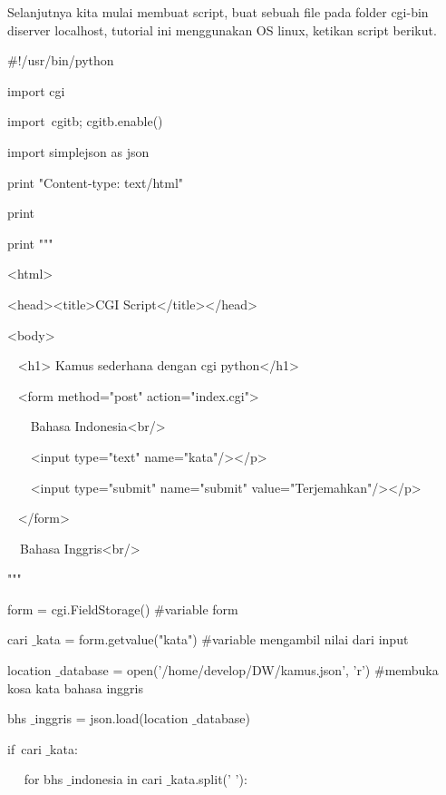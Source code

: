 \documentclass{wileySix}
\begin{document}
\noindent 
Selanjutnya kita mulai membuat script, buat sebuah file pada folder cgi-bin diserver localhost, tutorial ini menggunakan OS linux, ketikan script berikut. \par
\noindent 
$  \#  $!/usr/bin/python \par
\noindent 
import cgi \par
\noindent 
import~cgitb; cgitb.enable()   \par
\noindent 
import simplejson as json \par
\vspace{12pt}
\noindent 
print "Content-type: text/html" \par
\noindent 
print \par
\vspace{12pt}
\noindent 
print """ \par
\noindent 
<html> \par
\noindent 
<head><title>CGI Script</title></head> \par
\noindent 
<body> \par
\noindent 
~ <h1> Kamus sederhana dengan cgi python</h1> \par
\noindent 
~ <form method="post" action="index.cgi"> \par
\noindent 
~~~ Bahasa Indonesia<br/> \par
\noindent 
~~~ <input type="text" name="kata"/></p> \par
\noindent 
~~~ <input type="submit" name="submit" value="Terjemahkan"/></p> \par
\noindent 
~ </form> \par
\noindent 
~~Bahasa Inggris<br/>   \par
\noindent 
""" \par
\vspace{12pt}
\noindent 
form = cgi.FieldStorage()  $  \#  $variable form \par
\noindent 
cari $  \_  $kata = form.getvalue("kata")  $  \#  $variable mengambil nilai dari input \par
\vspace{12pt}
\noindent 
location $  \_  $database = open('/home/develop/DW/kamus.json', 'r')  $  \#  $membuka kosa kata bahasa inggris \par
\noindent 
bhs $  \_  $inggris = json.load(location $  \_  $database) \par
\vspace{12pt}
\noindent 
if~cari $  \_  $kata:~   \par
\noindent 
~~ for bhs $  \_  $indonesia in cari $  \_  $kata.split(' '):  \par
\end{document}
